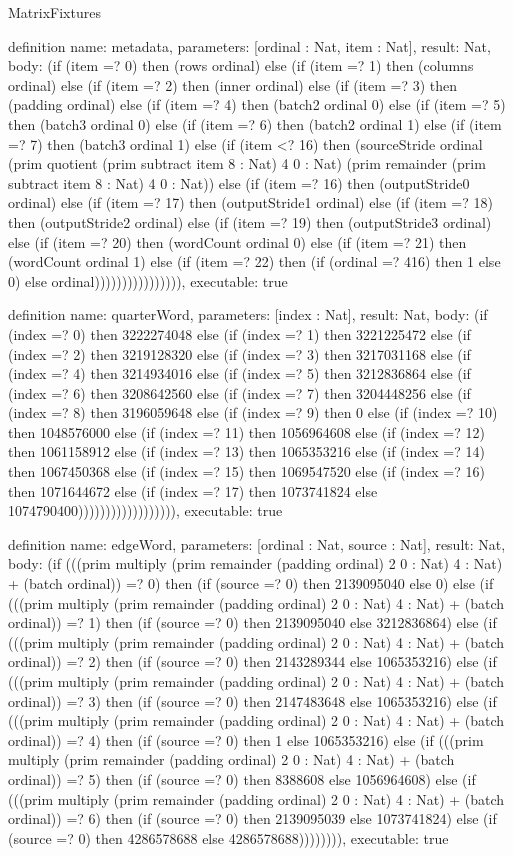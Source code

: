 \begin{lexlean}{MatrixFixtures}
\begin{semanticmodule}
definition{
  name: metadata,
  parameters: [ordinal : Nat, item : Nat],
  result: Nat,
  body: (if (item =? 0) then (rows ordinal) else (if (item =? 1) then (columns ordinal) else (if (item =? 2) then (inner ordinal) else (if (item =? 3) then (padding ordinal) else (if (item =? 4) then (batch2 ordinal 0) else (if (item =? 5) then (batch3 ordinal 0) else (if (item =? 6) then (batch2 ordinal 1) else (if (item =? 7) then (batch3 ordinal 1) else (if (item <? 16) then (sourceStride ordinal (prim quotient (prim subtract item 8 : Nat) 4 0 : Nat) (prim remainder (prim subtract item 8 : Nat) 4 0 : Nat)) else (if (item =? 16) then (outputStride0 ordinal) else (if (item =? 17) then (outputStride1 ordinal) else (if (item =? 18) then (outputStride2 ordinal) else (if (item =? 19) then (outputStride3 ordinal) else (if (item =? 20) then (wordCount ordinal 0) else (if (item =? 21) then (wordCount ordinal 1) else (if (item =? 22) then (if (ordinal =? 416) then 1 else 0) else ordinal)))))))))))))))),
  executable: true
}

definition{
  name: quarterWord,
  parameters: [index : Nat],
  result: Nat,
  body: (if (index =? 0) then 3222274048 else (if (index =? 1) then 3221225472 else (if (index =? 2) then 3219128320 else (if (index =? 3) then 3217031168 else (if (index =? 4) then 3214934016 else (if (index =? 5) then 3212836864 else (if (index =? 6) then 3208642560 else (if (index =? 7) then 3204448256 else (if (index =? 8) then 3196059648 else (if (index =? 9) then 0 else (if (index =? 10) then 1048576000 else (if (index =? 11) then 1056964608 else (if (index =? 12) then 1061158912 else (if (index =? 13) then 1065353216 else (if (index =? 14) then 1067450368 else (if (index =? 15) then 1069547520 else (if (index =? 16) then 1071644672 else (if (index =? 17) then 1073741824 else 1074790400)))))))))))))))))),
  executable: true
}

definition{
  name: edgeWord,
  parameters: [ordinal : Nat, source : Nat],
  result: Nat,
  body: (if (((prim multiply (prim remainder (padding ordinal) 2 0 : Nat) 4 : Nat) + (batch ordinal)) =? 0) then (if (source =? 0) then 2139095040 else 0) else (if (((prim multiply (prim remainder (padding ordinal) 2 0 : Nat) 4 : Nat) + (batch ordinal)) =? 1) then (if (source =? 0) then 2139095040 else 3212836864) else (if (((prim multiply (prim remainder (padding ordinal) 2 0 : Nat) 4 : Nat) + (batch ordinal)) =? 2) then (if (source =? 0) then 2143289344 else 1065353216) else (if (((prim multiply (prim remainder (padding ordinal) 2 0 : Nat) 4 : Nat) + (batch ordinal)) =? 3) then (if (source =? 0) then 2147483648 else 1065353216) else (if (((prim multiply (prim remainder (padding ordinal) 2 0 : Nat) 4 : Nat) + (batch ordinal)) =? 4) then (if (source =? 0) then 1 else 1065353216) else (if (((prim multiply (prim remainder (padding ordinal) 2 0 : Nat) 4 : Nat) + (batch ordinal)) =? 5) then (if (source =? 0) then 8388608 else 1056964608) else (if (((prim multiply (prim remainder (padding ordinal) 2 0 : Nat) 4 : Nat) + (batch ordinal)) =? 6) then (if (source =? 0) then 2139095039 else 1073741824) else (if (source =? 0) then 4286578688 else 4286578688)))))))),
  executable: true
}


\end{semanticmodule}
\end{lexlean}
